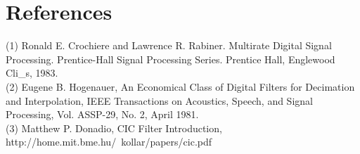 \section*{References}
(1)	Ronald E. Crochiere and Lawrence R. Rabiner. Multirate Digital Signal Processing. Prentice-Hall Signal Processing Series. Prentice Hall, Englewood Cli\_s, 1983. \\
(2)	Eugene B. Hogenauer, An Economical Class of Digital Filters for Decimation and Interpolation, IEEE Transactions on Acoustics, Speech, and Signal Processing, Vol. ASSP-29, No. 2, April 1981. \\
(3) Matthew P. Donadio, CIC Filter Introduction, http://home.mit.bme.hu/~kollar/papers/cic.pdf